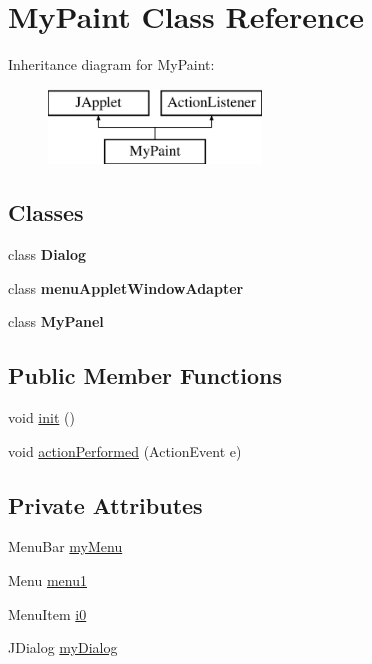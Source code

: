 \hypertarget{class_my_paint}{}\section{My\+Paint Class Reference}
\label{class_my_paint}
Inheritance diagram for My\+Paint\+:\begin{figure}[H]
\begin{center}
\leavevmode
\includegraphics[height=2.000000cm]{class_my_paint}
\end{center}
\end{figure}
\subsection*{Classes}
\begin{DoxyCompactItemize}
\item 
class {\bfseries Dialog}
\item 
class {\bfseries menu\+Applet\+Window\+Adapter}
\item 
class {\bfseries My\+Panel}
\end{DoxyCompactItemize}
\subsection*{Public Member Functions}
\begin{DoxyCompactItemize}
\item 
void \hyperlink{class_my_paint_a215b06cf6775c850921de5180ea65415}{init} ()
\item 
void \hyperlink{class_my_paint_accad3defca48e5a0b34dc2bd3931a183}{action\+Performed} (Action\+Event e)
\end{DoxyCompactItemize}
\subsection*{Private Attributes}
\begin{DoxyCompactItemize}
\item 
Menu\+Bar \hyperlink{class_my_paint_a0484d7171ca748f1b39619fac6b97c29}{my\+Menu}
\item 
Menu \hyperlink{class_my_paint_a9544a7124c7b807531283b3226175b59}{menu1}
\item 
Menu\+Item \hyperlink{class_my_paint_a5f26a81460c19643fbad427c327e87dd}{i0}
\item 
J\+Dialog \hyperlink{class_my_paint_a117ac196604e9160d5d572d97744e528}{my\+Dialog}
\end{DoxyCompactItemize}


